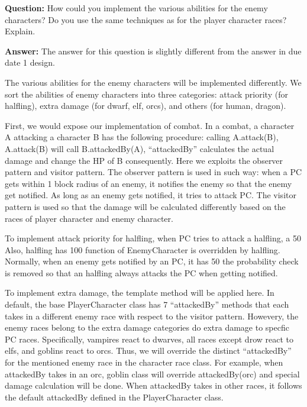 \documentclass[11pt]{article}
\theoremstyle{plain} \newtheorem{theorem*}{Theorem}[subsection]
\begin{document}
\textbf{Question:}
How could you implement the various abilities for the enemy characters? Do you
use the same techniques as for the player character races? Explain. 

\textbf{Answer:}
The answer for this question is slightly different from the answer in due date
1 design. 

The various abilities for the enemy characters will be implemented differently.
We sort the abilities of enemy characters into three categories: attack
priority (for halfling), extra damage (for dwarf, elf, orcs), and others (for
human, dragon).  

First, we would expose our implementation of combat. In a combat, a character A
attacking a character B has the following procedure: calling A.attack(B),
A.attack(B) will call B.attackedBy(A), “attackedBy” calculates the actual
damage and change the HP of B consequently. Here we exploits the observer
pattern and visitor pattern. The observer pattern is used in such way: when a
PC gets within 1 block radius of an enemy, it notifies the enemy so that the
enemy get notified. As long as an enemy gets notified, it tries to attack PC.
The visitor pattern is used so that the damage will be calculated differently
based on the races of player character and enemy character. 

To implement attack priority for halfling, when PC tries to attack a halfling,
a 50%
Also, halfling has 100%
function of EnemyCharacter is overridden by halfling. Normally, when an enemy
gets notified by an PC, it has 50%
the probability check is removed so that an halfling always attacks the PC when
getting notified. 

To implement extra damage, the template method will be applied here. In
default, the base PlayerCharacter class has 7 “attackedBy” methods that each
takes in a different enemy race with respect to the visitor pattern. Howevery,
the enemy races belong to the extra damage categories do extra damage to
specfic PC races. Specifically, vampires react to dwarves, all races except
drow react to elfs, and goblins react to orcs. Thus, we will override the
distinct “attackedBy” for the mentioned enemy race in the character race class.
For example,  when attackedBy takes in an orc, goblin class will override
attackedBy(orc) and special damage calculation will be done. When attackedBy
takes in other races, it follows the default attackedBy defined in the
PlayerCharacter class. 
\end{document}
